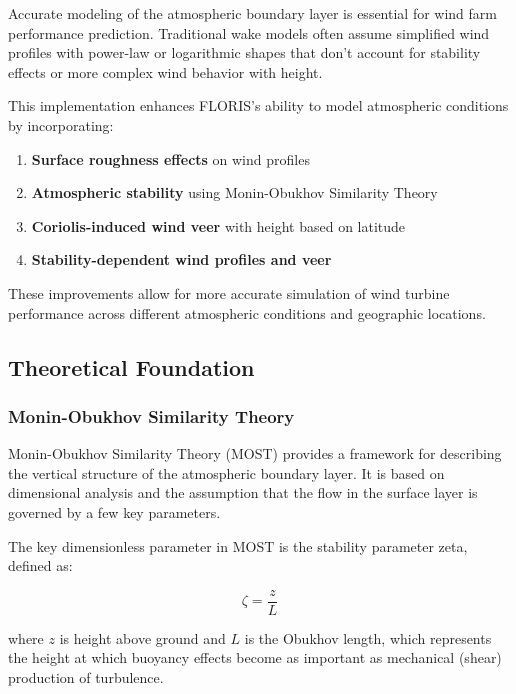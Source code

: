 \documentclass[
]{article}
\providecommand{\tightlist}{%
  \setlength{\itemsep}{0pt}\setlength{\parskip}{0pt}}
\begin{document}
Accurate modeling of the atmospheric boundary layer is essential for
wind farm performance prediction. Traditional wake models often assume
simplified wind profiles with power-law or logarithmic shapes that don't
account for stability effects or more complex wind behavior with height.

This implementation enhances FLORIS's ability to model atmospheric
conditions by incorporating:

\begin{enumerate}
\def\labelenumi{\arabic{enumi}.}
\tightlist
\item
  \textbf{Surface roughness effects} on wind profiles
\item
  \textbf{Atmospheric stability} using Monin-Obukhov Similarity Theory
\item
  \textbf{Coriolis-induced wind veer} with height based on latitude
\item
  \textbf{Stability-dependent wind profiles and veer}
\end{enumerate}

These improvements allow for more accurate simulation of wind turbine
performance across different atmospheric conditions and geographic
locations.

\hypertarget{theoretical-foundation}{%
\subsection{Theoretical Foundation}\label{theoretical-foundation}}

\hypertarget{monin-obukhov-similarity-theory}{%
\subsubsection{Monin-Obukhov Similarity
Theory}\label{monin-obukhov-similarity-theory}}

Monin-Obukhov Similarity Theory (MOST) provides a framework for
describing the vertical structure of the atmospheric boundary layer. It
is based on dimensional analysis and the assumption that the flow in the
surface layer is governed by a few key parameters.

The key dimensionless parameter in MOST is the stability parameter zeta,
defined as:

\[\zeta = \frac{z}{L}\]

where \(z\) is height above ground and \(L\) is the Obukhov length,
which represents the height at which buoyancy effects become as
important as mechanical (shear) production of turbulence.
\end{document}
